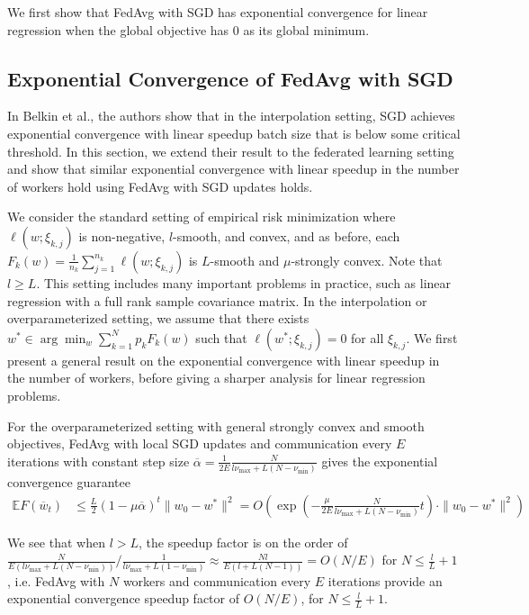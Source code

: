 We first show that FedAvg with SGD has exponential convergence for
linear regression when the global objective has 0 as its global minimum.

\subsection{Exponential Convergence of FedAvg with SGD}

In Belkin et al., the authors show that in the interpolation setting,
SGD achieves exponential convergence with linear speedup batch size
that is below some critical threshold. In this section, we extend
their result to the federated learning setting and show that similar
exponential convergence with linear speedup in the number of workers
hold using FedAvg with SGD updates holds. 

We consider the standard setting of empirical risk minimization where
$\ell(w;\xi_{k,j})$ is non-negative, $l$-smooth, and convex, and
as before, each $F_{k}(w)=\frac{1}{n_{k}}\sum_{j=1}^{n_{k}}\ell(w;\xi_{k,j})$
is $L$-smooth and $\mu$-strongly convex. Note that $l\geq L$. This
setting includes many important problems in practice, such as linear
regression with a full rank sample covariance matrix. In the interpolation
or overparameterized setting, we assume that there exists $w^{\ast}\in\arg\min_{w}\sum_{k=1}^{N}p_{k}F_{k}(w)$
such that $\ell(w^{\ast};\xi_{k,j})=0$ for all $\xi_{k,j}$. We first
present a general result on the exponential convergence with linear
speedup in the number of workers, before giving a sharper analysis
for linear regression problems. 
\begin{theorem}
	For the overparameterized setting with general strongly convex and
	smooth objectives, FedAvg with local SGD updates and communication
	every $E$ iterations with constant step size $\overline{\alpha}=\frac{1}{2E}\frac{N}{l\nu_{\max}+L(N-\nu_{\min})}$
	gives the exponential convergence guarantee 
	\begin{align*}
	\mathbb{E}F(\overline{w}_{t}) & \leq\frac{L}{2}(1-\mu\overline{\alpha})^{t}\|w_{0}-w^{\ast}\|^{2}=O(\exp(-\frac{\mu}{2E}\frac{N}{l\nu_{\max}+L(N-\nu_{\min})}t)\cdot\|w_{0}-w^{\ast}\|^{2})
	\end{align*}
\end{theorem}
%
We see that when $l>L$, the speedup factor is on the order of $\frac{N}{E(l\nu_{\max}+L(N-\nu_{\min}))}/\frac{1}{l\nu_{\max}+L(1-\nu_{\min})}\approx\frac{Nl}{E(l+L(N-1))}=O(N/E)$
for $N\leq\frac{l}{L}+1$, i.e. FedAvg with $N$ workers and communication
every $E$ iterations provide an exponential convergence speedup factor
of $O(N/E)$, for $N\leq\frac{l}{L}+1$.

